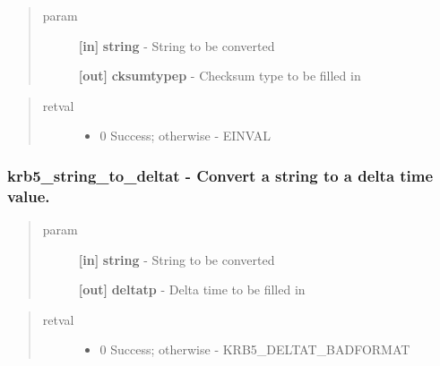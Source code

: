 \documentclass[letterpaper,10pt,english]{sphinxmanual}
\begin{document}
\begin{quote}\begin{description}
\item[{param}] \leavevmode
\textbf{{[}in{]}} \textbf{string} - String to be converted

\textbf{{[}out{]}} \textbf{cksumtypep} - Checksum type to be filled in

\end{description}\end{quote}
\begin{quote}\begin{description}
\item[{retval}] \leavevmode\begin{itemize}
\item {} 
0   Success; otherwise - EINVAL

\end{itemize}

\end{description}\end{quote}


\subsubsection{krb5\_string\_to\_deltat -  Convert a string to a delta time value.}
\label{appdev/refs/api/krb5_string_to_deltat::doc}\label{appdev/refs/api/krb5_string_to_deltat:krb5-string-to-deltat-convert-a-string-to-a-delta-time-value}

\begin{fulllineitems}
\label{appdev/refs/api/krb5_string_to_deltat:krb5_string_to_deltat}
\end{fulllineitems}

\begin{quote}\begin{description}
\item[{param}] \leavevmode
\textbf{{[}in{]}} \textbf{string} - String to be converted

\textbf{{[}out{]}} \textbf{deltatp} - Delta time to be filled in

\end{description}\end{quote}
\begin{quote}\begin{description}
\item[{retval}] \leavevmode\begin{itemize}
\item {} 
0   Success; otherwise - KRB5\_DELTAT\_BADFORMAT

\end{itemize}

\end{description}\end{quote}
\end{document}
